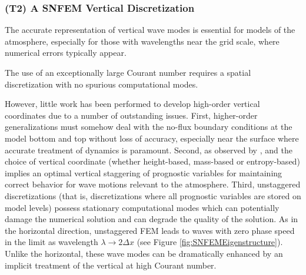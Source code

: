 \documentclass[11pt]{article}
\begin{document}
\subsubsection{(T2) A SNFEM Vertical Discretization} \label{sec:VerticalSNFEM}


The accurate representation of vertical wave modes is essential for models of the atmosphere, especially for those with wavelengths near the grid scale, where numerical errors typically appear.  

The use of an exceptionally large Courant number requires a spatial discretization with no spurious computational modes.

However, little work has been performed to develop high-order vertical coordinates due to a number of outstanding issues.  First, higher-order generalizations must somehow deal with the no-flux boundary conditions at the model bottom and top without loss of accuracy, especially near the surface where accurate treatment of dynamics is paramount.  Second, as observed by \cite{JTTJW2005JCP}, \cite{JT2006QJRMS} and \cite{MDTRDA2007JCP} the choice of vertical coordinate (whether height-based, mass-based or entropy-based) implies an optimal vertical staggering of prognostic variables for maintaining correct behavior for wave motions relevant to the atmosphere.  Third, unstaggered discretizations (that is, discretizations where all prognostic variables are stored on model levels) possess stationary computational modes which can potentially damage the numerical solution and can degrade the quality of the solution.  As in the horizontal direction, unstaggered FEM leads to waves with zero phase speed in the limit as wavelength $\lambda \to 2 \Delta x$ (see Figure \ref{fig:SNFEMEigenstructure}).  Unlike the horizontal, these wave modes can be dramatically enhanced by an implicit treatment of the vertical at high Courant number.
\end{document}
